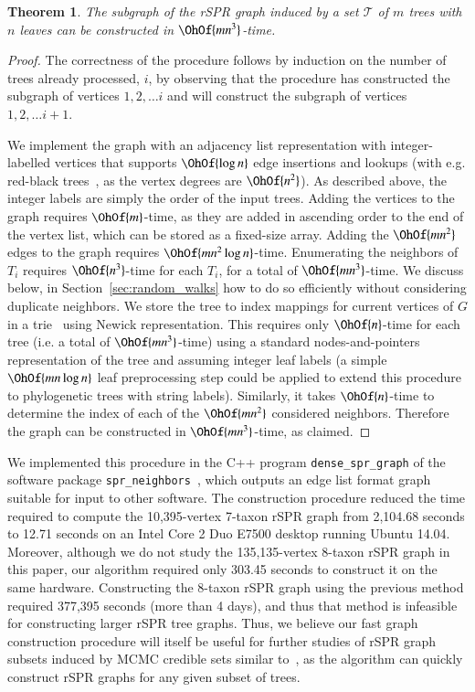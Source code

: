\documentclass[]{elsarticle}
\newtheorem{thm}{Theorem}[section]
\begin{document}
\begin{thm}
	\label{thm:construct_graph}
	The subgraph of the rSPR graph induced by a set $\mathcal{T}$ of $m$ trees with $n$ leaves can be constructed in $\OhOf{mn^3}$-time.
\end{thm}
\begin{proof}
	The correctness of the procedure follows by induction on the number of trees already processed, $i$, by observing that the procedure has constructed the subgraph of vertices $1, 2,  \ldots i$ and will construct the subgraph of vertices $1, 2, \ldots i+1$.

	We implement the graph with an adjacency list representation with integer-labelled vertices that supports $\OhOf{\log n}$ edge insertions and lookups (with e.g. red-black trees~\citep{guibas1978dichromatic}, as the vertex degrees are $\OhOf{n^2}$).
	As described above, the integer labels are simply the order of the input trees.
	Adding the vertices to the graph requires $\OhOf{m}$-time, as they are added in ascending order to the end of the vertex list, which can be stored as a fixed-size array.
	Adding the $\OhOf{mn^2}$ edges to the graph requires $\OhOf{mn^2 \log n}$-time.
	Enumerating the neighbors of $T_i$ requires $\OhOf{n^3}$-time for each $T_i$, for a total of $\OhOf{mn^3}$-time.
	We discuss below, in Section~\ref{sec:random_walks} how to do so efficiently without considering duplicate neighbors.
	We store the tree to index mappings for current vertices of $G$ in a trie~\citep{fredkin1960trie} using Newick representation.
	This requires only $\OhOf{n}$-time for each tree (i.e. a total of $\OhOf{mn^3}$-time) using a standard nodes-and-pointers representation of the tree and assuming integer leaf labels (a simple $\OhOf{mn\log n}$ leaf preprocessing step could be applied to extend this procedure to phylogenetic trees with string labels).
	Similarly, it takes $\OhOf{n}$-time to determine the index of each of the $\OhOf{mn^2}$ considered neighbors.
	Therefore the graph can be constructed in $\OhOf{mn^3}$-time, as claimed.
\end{proof}

We implemented this procedure in the C++ program \texttt{dense\_spr\_graph} of the software package \texttt{spr\_neighbors}~\citep{spr_neighbors}, which outputs an edge list format graph suitable for input to other software.
The construction procedure reduced the time required to compute the 10,395-vertex 7-taxon rSPR graph from 2,104.68 seconds to 12.71 seconds on an Intel Core 2 Duo E7500 desktop running Ubuntu 14.04.
Moreover, although we do not study the 135,135-vertex 8-taxon rSPR graph in this paper, our algorithm required only 303.45 seconds to construct it on the same hardware.
Constructing the 8-taxon rSPR graph using the previous method required 377,395 seconds (more than 4 days), and thus that method is infeasible for constructing larger rSPR tree graphs.
Thus, we believe our fast graph construction procedure will itself be useful for further studies of rSPR graph subsets induced by MCMC credible sets similar to~\citep{Whidden2015-yi}, as the algorithm can quickly construct rSPR graphs for any given subset of trees.
\end{document}
